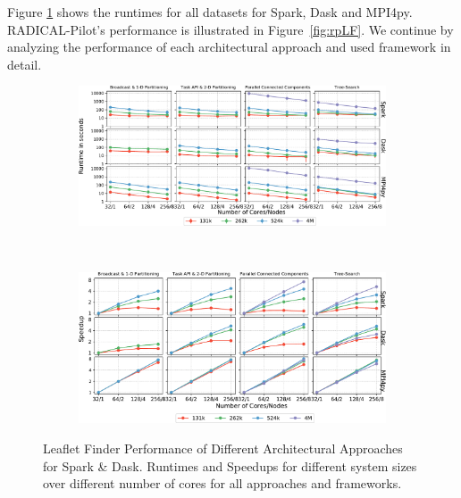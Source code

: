 Figure \ref{fig:All4approachesNoRp} shows the runtimes for all datasets for Spark, Dask and MPI4py.
RADICAL-Pilot's performance is illustrated in Figure~\ref{fig:rpLF}.
We continue by analyzing the performance of each architectural approach and used framework in detail.

\begin{figure}[t]
    \centering
    \begin{subfigure}{.85\textwidth}
        \centering
        \includegraphics[width=.95\linewidth]{figures/data_analytics_hpc/task_par/All4approachesWith4M_logscaleline.pdf}
    \end{subfigure}\\
    \begin{subfigure}{.85\textwidth}
        \centering
        \includegraphics[width=.95\linewidth]{figures/data_analytics_hpc/task_par/All4approachesWith4MSpeedup.pdf}
    \end{subfigure}
    \caption{Leaflet Finder Performance of Different Architectural Approaches for Spark \& Dask.
            Runtimes and Speedups for different system sizes over different number of cores for all approaches and frameworks.}
    \label{fig:All4approachesNoRp}
\end{figure}


